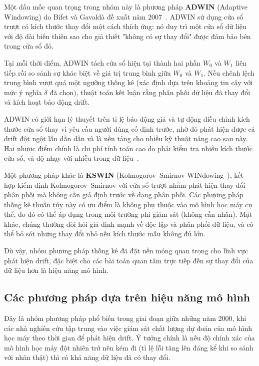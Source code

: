 Một dấu mốc quan trọng trong nhóm này là phương pháp \textbf{ADWIN} (Adaptive Windowing) do Bifet và Gavaldà đề xuất
năm 2007~\cite{bifet2007learning}. ADWIN sử dụng cửa sổ trượt có kích thước thay đổi một cách thích ứng: nó duy trì
một cửa sổ dữ liệu với độ dài biến thiên sao cho giả thiết "không có sự thay đổi" được đảm bảo bên trong cửa sổ đó.

Tại mỗi thời điểm, ADWIN tách cửa sổ hiện tại thành hai phần $W_0$ và $W_1$ liên tiếp rồi so sánh
sự khác biệt về giá trị trung bình giữa $W_0$ và $W_1$. Nếu chênh lệch trung bình vượt quá một ngưỡng thống kê (xác định
dựa trên khoảng tin cậy với mức ý nghĩa $\delta$ đã chọn), thuật toán kết luận rằng phân phối dữ liệu đã thay đổi và kích
hoạt báo động drift.

ADWIN có giới hạn lý thuyết trên tỉ lệ báo động giả và tự động điều chỉnh kích thước cửa sổ thay vì yêu cầu người dùng cố định trước, nhờ đó phát hiện được cả drift đột ngột lẫn dần dần và là nền tảng cho nhiều kỹ thuật nâng cao sau này. Hai nhược điểm chính là chi phí tính toán cao do phải kiểm tra nhiều kích thước cửa sổ, và độ nhạy với nhiễu trong dữ liệu~\cite{hinder2024survey_partA}.

Một phương pháp khác là \textbf{KSWIN} (Kolmogorov–Smirnov WINdowing~\cite{raab2020reactive}), kết hợp kiểm định Kolmogorov–Smirnov với cửa
sổ trượt nhằm phát hiện thay đổi phân phối mà không cần giả định trước về dạng phân phối. Các phương pháp thống kê thuần túy này có ưu điểm là không phụ
thuộc vào mô hình học máy cụ thể, do đó có thể áp dụng trong môi trường phi giám sát (không cần nhãn). Mặt khác, chúng thường đòi
hỏi giả định mạnh về độc lập và phân phối dữ liệu, và có thể bỏ sót những thay đổi nhỏ nếu kích thước mẫu không đủ lớn.

Dù vậy, nhóm phương pháp thống kê đã đặt nền móng quan trọng cho lĩnh vực phát hiện drift, đặc biệt cho các bài toán quan tâm trực tiếp đến
sự thay đổi của dữ liệu hơn là hiệu năng mô hình.

\subsection{Các phương pháp dựa trên hiệu năng mô hình}
Đây là nhóm phương pháp phổ biến trong giai đoạn giữa những năm 2000, khi các nhà nghiên cứu tập trung vào việc giám sát chất
lượng dự đoán của mô hình học máy theo thời gian để phát hiện drift. Ý tưởng chính là nếu độ chính xác của mô hình học máy đột
nhiên trở nên kém đi (tỉ lệ lỗi tăng lên đáng kể khi so sánh với nhãn thật) thì có khả năng dữ liệu đã có thay đổi.

